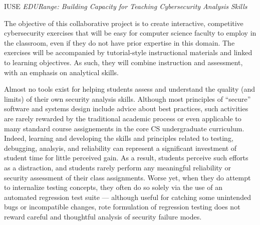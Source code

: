 \documentclass[11pt]{report}
\begin{document}
\begin{center} 
{\Large IUSE {\em EDURange: Building Capacity for Teaching Cybersecurity Analysis Skills}}
\end{center}

The objective of this collaborative project is to create interactive, competitive 
cybersecurity exercises that will be easy for computer science faculty to employ in the 
classroom, even if they do not have prior expertise in this domain.  The exercises 
will be accompanied by tutorial-style instructional materials and linked to learning objectives. 
As such, they will combine instruction and assessment, with an emphasis on
analytical skills.


Almost no tools exist for helping students assess and
understand the quality (and limits) of their own security analysis
skills.  Although most principles of ``secure'' software and systems
design include advice about best practices, such activities are rarely
rewarded by the traditional academic process or even applicable to
many standard course assignements in the core CS undergraduate
curriculum.  Indeed, learning and developing the skills and principles
related to testing, debugging, analsyis, and reliability can represent
a significant investment of student time for little perceived gain. As
a result, students perceive such efforts as a distraction, and
students rarely perform any meaningful reliability or security
assessment of their class assignments.  Worse yet, when they do
attempt to internalize testing concepts, they often do so solely via
the use of an automated regression test suite --- although useful for
catching some unintended bugs or incompatible changes, rote
formulation of regression testing does not reward careful and
thoughtful analysis of security failure modes.
\end{document}

